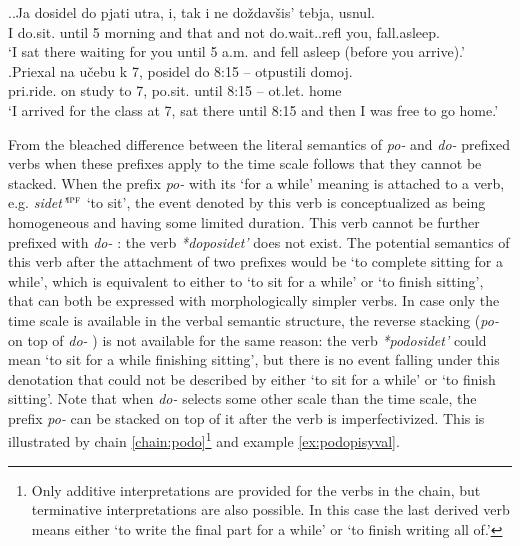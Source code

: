\ex.\ag.\label{ex:dosidet:do}Ja dosidel do pjati utra, i, tak i ne do\v{z}dav\v{s}is' tebja, usnul.\\
I do.sit. until 5 morning and that and not do.wait..refl you, fall.asleep.\\
\trans `I sat there waiting for you until 5 a.m. and fell asleep (before you arrive).'\\
\bg.\label{ex:posidet:do}Priexal na u\v{c}ebu k 7, posidel do 8:15 -- otpustili domoj.\\
pri.ride. on study to 7, po.sit. until 8:15 -- ot.let. home\\
\trans `I arrived for the class at 7, sat there until 8:15 and then I was free to go home.'

From the bleached difference between the literal semantics of \textit{po-}   and \textit{do-}  prefixed verbs when these prefixes apply to the time scale follows that they cannot be stacked. When the prefix \textit{po-}   with its `for a while' meaning is attached to a verb, e.g. \textit{sidet'}$^{\textsc{ipf}}$ `to sit', the event denoted by this verb is conceptualized as being homogeneous and having some limited duration. This verb cannot be further prefixed with \textit{do-}  : the verb \textit{*doposidet'} does not exist. The potential semantics of this verb after the attachment of two prefixes would be `to complete sitting for a while', which is equivalent to either to `to sit for a while' or `to finish sitting', that can both be expressed with morphologically simpler verbs. In case only the time scale is available in the verbal semantic structure, the reverse stacking (\textit{po-}   on top of \textit{do-}  ) is not available for the same reason: the verb \textit{*podosidet'} could mean `to sit for a while finishing sitting', but there is no event falling under this denotation that could not be described by either `to sit for a while' or `to finish sitting'. Note that when \textit{do-}   selects some other scale than the time scale, the prefix \textit{po-}   can be stacked on top of it after the verb is imperfectivized. This is illustrated by chain \ref{chain:podo}\footnote{Only additive interpretations are provided for the verbs in the chain, but terminative  interpretations are also possible. In this case the last derived verb means either `to write the final part for a while' or `to finish writing all of.'} and example \ref{ex:podopisyval}.


